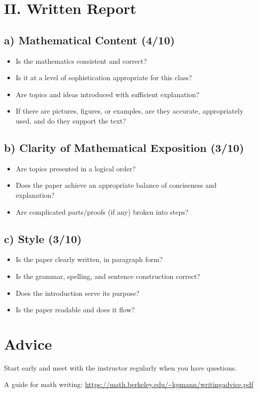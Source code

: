 \documentclass[12pt]{amsart}
\begin{document}
\section*{II. Written Report}

\subsection*{a) Mathematical Content (4/10)}
\begin{itemize}
	\item Is the mathematics consistent and correct?
	\item Is it at a level of sophistication appropriate for this class?
	\item Are topics and ideas introduced with sufficient explanation?
	\item If there are pictures, figures, or examples, are they accurate, appropriately used, and do they support the text?
\end{itemize}

\subsection*{b) Clarity of Mathematical Exposition (3/10)}
\begin{itemize}
	\item Are topics presented in a logical order?
	\item Does the paper achieve an appropriate balance of conciseness and explanation?
	\item Are complicated parts/proofs (if any) broken into steps?
\end{itemize}

\subsection*{c) Style (3/10)}
\begin{itemize}
	\item Is the paper clearly written, in paragraph form?
	\item Is the grammar, spelling, and sentence construction correct?
	\item Does the introduction serve its purpose?
	\item Is the paper readable and does it flow?
\end{itemize}


\section{Advice}
Start early and meet with the instructor regularly when you have questions.

A guide for math writing:
\url{https://math.berkeley.edu/~kpmann/writingadvice.pdf}

\printbibliography
%
%
\end{document}
